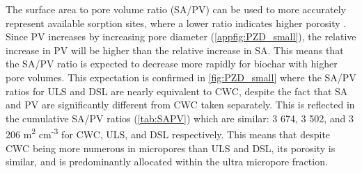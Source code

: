 \begin{table}
\centering
\caption{Surface area (SA), pore volume (PV), elemental content (C, O, H, N) and ratios for the biochars produced for the batch tests.}
\end{table}

The surface area to pore volume ratio (SA/PV) can be used to more accurately represent available sorption sites, where a lower ratio indicates higher porosity \citep{presser2011SAPV}. Since PV increases by increasing pore diameter (\cref{appfig:PZD_small}), the relative increase in PV will be higher than the relative increase in SA. This means that the SA/PV ratio is expected to decrease more rapidly for biochar with higher pore volumes. This expectation is confirmed in \cref{fig:PZD_small} where the SA/PV ratios for ULS and DSL are nearly equivalent to CWC, despite the fact that SA and PV are significantly different from CWC taken separately. This is reflected in the cumulative SA/PV ratios (\cref{tab:SAPV}) which are similar: 3 674, 3 502, and 3 206 m\textsuperscript{2} cm\textsuperscript{-3} for CWC, ULS, and DSL respectively. This means that despite CWC being more numerous in micropores than ULS and DSL, its porosity is similar, and is predominantly allocated within the ultra micropore fraction.


